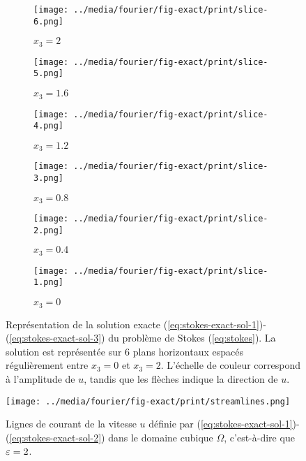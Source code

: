 \begin{figure}[t]
  \begin{center}
    \begin{subfigure}[b]{0.49\textwidth}
      \texttt{[image: ../media/fourier/fig-exact/print/slice-6.png]}
      \caption{$x_3 = 2$}
    \end{subfigure}
    \begin{subfigure}[b]{0.49\textwidth}
      \texttt{[image: ../media/fourier/fig-exact/print/slice-5.png]}
      \caption{$x_3 = 1.6$}
    \end{subfigure}
    \begin{subfigure}[b]{0.49\textwidth}
      \texttt{[image: ../media/fourier/fig-exact/print/slice-4.png]}
      \caption{$x_3 = 1.2$}
    \end{subfigure}
    \begin{subfigure}[b]{0.49\textwidth}
      \texttt{[image: ../media/fourier/fig-exact/print/slice-3.png]}
      \caption{$x_3 = 0.8$}
    \end{subfigure}
    \begin{subfigure}[b]{0.49\textwidth}
      \texttt{[image: ../media/fourier/fig-exact/print/slice-2.png]}
      \caption{$x_3 = 0.4$}
    \end{subfigure}
    \begin{subfigure}[b]{0.49\textwidth}
      \texttt{[image: ../media/fourier/fig-exact/print/slice-1.png]}
      \caption{$x_3 = 0$}
    \end{subfigure}
    \caption{Représentation de la solution exacte
      (\ref{eq:stokes-exact-sol-1})-(\ref{eq:stokes-exact-sol-3}) du
      problème de Stokes (\ref{eq:stokes}). La solution est
      représentée sur 6 plans horizontaux espacés
      régulièrement entre $x_3 = 0$ et $x_3 = 2$. L'échelle de
      couleur correspond à l'amplitude de $u$, tandis que les
      flèches indique la direction de $u$.}
    \label{fig:stokes-exact-sol}
  \end{center}
\end{figure}

\begin{figure}[t]
  \begin{center}
    \texttt{[image: ../media/fourier/fig-exact/print/streamlines.png]}
    \caption{Lignes de courant de la vitesse $u$ définie par
      (\ref{eq:stokes-exact-sol-1})-(\ref{eq:stokes-exact-sol-2}) dans
      le domaine cubique $\Omega$, c'est-à-dire que $\varepsilon = 2$.}
    \label{fig:stokes-exact-sol-streamlines}
  \end{center}
\end{figure}



